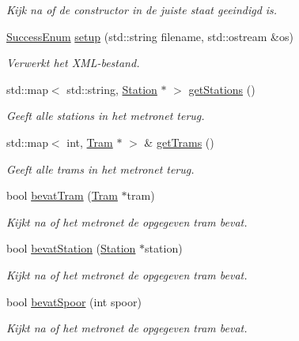 \begin{DoxyCompactItemize}
\begin{DoxyCompactList}\small\item\em Kijk na of de constructor in de juiste staat geeindigd is. \end{DoxyCompactList}\item 
\hyperlink{_metronet_8h_ae69e1bf070c1c339170236b3fef70a4d}{Success\+Enum} \hyperlink{class_metronet_ad12d6e52c7f5c23d23e87992b4abc1fa}{setup} (std\+::string filename, std\+::ostream \&os)
\begin{DoxyCompactList}\small\item\em Verwerkt het X\+M\+L-\/bestand. \end{DoxyCompactList}\item 
std\+::map$<$ std\+::string, \hyperlink{class_station}{Station} $\ast$ $>$ \hyperlink{class_metronet_a756f8163c67c4e559699b9c508fb1346}{get\+Stations} ()
\begin{DoxyCompactList}\small\item\em Geeft alle stations in het metronet terug. \end{DoxyCompactList}\item 
std\+::map$<$ int, \hyperlink{class_tram}{Tram} $\ast$ $>$ \& \hyperlink{class_metronet_a9aab7bfe14dbd5f7e258a55007542c36}{get\+Trams} ()
\begin{DoxyCompactList}\small\item\em Geeft alle trams in het metronet terug. \end{DoxyCompactList}\item 
bool \hyperlink{class_metronet_a0bcafdae671ac5fff7a4b54429f440ba}{bevat\+Tram} (\hyperlink{class_tram}{Tram} $\ast$tram)
\begin{DoxyCompactList}\small\item\em Kijkt na of het metronet de opgegeven tram bevat. \end{DoxyCompactList}\item 
bool \hyperlink{class_metronet_a8f2d201eee99681d122fd9031cf4d6c6}{bevat\+Station} (\hyperlink{class_station}{Station} $\ast$station)
\begin{DoxyCompactList}\small\item\em Kijkt na of het metronet de opgegeven tram bevat. \end{DoxyCompactList}\item 
bool \hyperlink{class_metronet_a0404525187984ca1fc437eef7a09e54a}{bevat\+Spoor} (int spoor)
\begin{DoxyCompactList}\small\item\em Kijkt na of het metronet de opgegeven tram bevat. \end{DoxyCompactList}\item 

\end{DoxyCompactItemize}
